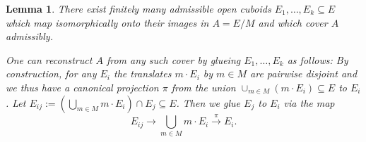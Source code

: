 \documentclass[10pt,oneside]{amsart}
\newtheorem{lemma}[theorem]{Lemma}
\theoremstyle{definition}
\begin{document}
	\begin{lemma}\label{an admissible cover of A by cuboids of E}
	There exist finitely many admissible open cuboids $E_1,\dots,E_k\subseteq E$ which map isomorphically onto their images in $A=E/M$ and which cover $A$ admissibly. 
	
	One can reconstruct $A$ from any such cover by glueing $E_1,\dots,E_k$ as follows: By construction, for any $E_i$ the translates $m\cdot E_i$ by $m\in M$ are pairwise disjoint and we thus have a canonical projection $\pi$ from the union $\cup_{m\in M} (m\cdot E_i)\subseteq E$ to $E_i$.	Let $E_{ij}:=(\bigcup_{m\in M} m\cdot E_i)\cap E_j \subseteq E$. Then we glue $E_j$ to $E_i$ via the map
	\[E_{ij}\rightarrow \bigcup_{m\in M} m\cdot E_i \xrightarrow{\pi} E_i.\]
	
	\begin{figure}
		
\end{figure}
\end{lemma}
\end{document}
